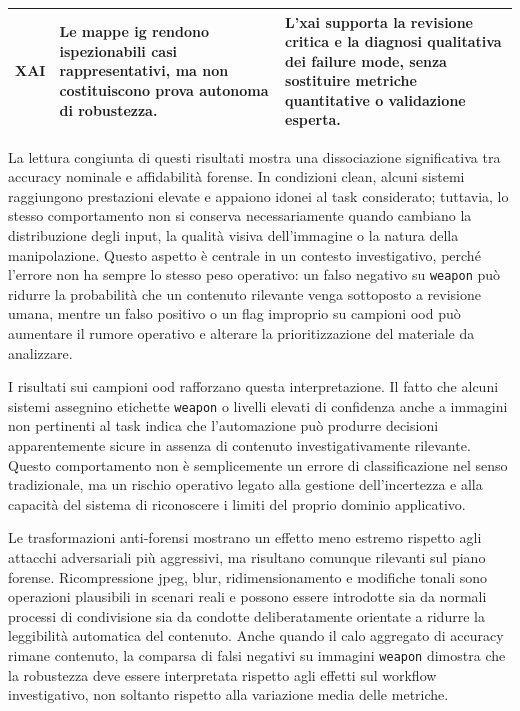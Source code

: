 \begin{table}[H]
\begin{tabularx}{\textwidth}{@{}p{} X X@{}}
XAI
& Le mappe \gls{ig} rendono ispezionabili casi rappresentativi, ma non
  costituiscono prova autonoma di robustezza.
& L'\gls{xai} supporta la revisione critica e la diagnosi qualitativa dei
  failure mode, senza sostituire metriche quantitative o validazione esperta. \\
\bottomrule
\end{tabularx}
\end{table}

La lettura congiunta di questi risultati mostra una dissociazione significativa
tra accuracy nominale e affidabilità forense. In condizioni clean, alcuni sistemi
raggiungono prestazioni elevate e appaiono idonei al task considerato; tuttavia,
lo stesso comportamento non si conserva necessariamente quando cambiano la
distribuzione degli input, la qualità visiva dell'immagine o la natura della
manipolazione. Questo aspetto è centrale in un contesto investigativo, perché
l'errore non ha sempre lo stesso peso operativo: un falso negativo su
\texttt{weapon} può ridurre la probabilità che un contenuto rilevante venga
sottoposto a revisione umana, mentre un falso positivo o un flag improprio su
campioni \gls{ood} può aumentare il rumore operativo e alterare la
prioritizzazione del materiale da analizzare.

I risultati sui campioni \gls{ood} rafforzano questa interpretazione. Il fatto
che alcuni sistemi assegnino etichette \texttt{weapon} o livelli elevati di
confidenza anche a immagini non pertinenti al task indica che l'automazione può
produrre decisioni apparentemente sicure in assenza di contenuto
investigativamente rilevante. Questo comportamento non è semplicemente un errore
di classificazione nel senso tradizionale, ma un rischio operativo legato alla
gestione dell'incertezza e alla capacità del sistema di riconoscere i limiti del
proprio dominio applicativo.

Le trasformazioni anti-forensi mostrano un effetto meno estremo rispetto agli
attacchi adversariali più aggressivi, ma risultano comunque rilevanti sul piano
forense. Ricompressione \gls{jpeg}, blur, ridimensionamento e modifiche tonali sono
operazioni plausibili in scenari reali e possono essere introdotte sia da normali
processi di condivisione sia da condotte deliberatamente orientate a ridurre la
leggibilità automatica del contenuto. Anche quando il calo aggregato di accuracy
rimane contenuto, la comparsa di falsi negativi su immagini \texttt{weapon}
dimostra che la robustezza deve essere interpretata rispetto agli effetti sul
workflow investigativo, non soltanto rispetto alla variazione media delle
metriche.

